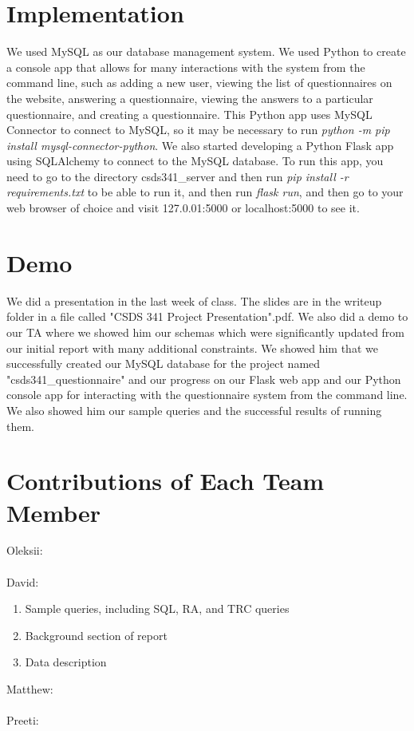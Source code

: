 \documentclass[12pt, oneside, a4paper]{article}
\begin{document}
    \section{Implementation}
    We used MySQL as our database management system. We used Python to create a console app that allows for many interactions with the system from the command line, such as adding a new user, viewing the list of questionnaires on the website, answering a questionnaire, viewing the answers to a particular questionnaire, and creating a questionnaire. This Python app uses MySQL Connector to connect to MySQL, so it may be necessary to run \emph{python -m pip install mysql-connector-python}. We also started developing a Python Flask app using SQLAlchemy to connect to the MySQL database. To run this app, you need to go to the directory csds341\_server and then run \emph{pip install -r requirements.txt} to be able to run it, and then run \emph{flask run}, and then go to your web browser of choice and visit 127.0.01:5000 or localhost:5000 to see it.
    \section{Demo}
    We did a presentation in the last week of class. The slides are in the writeup folder in a file called "CSDS 341 Project Presentation".pdf. We also did a demo to our TA where we showed him our schemas which were significantly updated from our initial report with many additional constraints. We showed him that we successfully created our MySQL database for the project named "csds341\_questionnaire" and our progress on our Flask web app and our Python console app for interacting with the questionnaire system from the command line. We also showed him our sample queries and the successful results of running them.
    \section{Contributions of Each Team Member}
    Oleksii:
    \\
    \\
    David:
    \begin{enumerate}
        \item Sample queries, including SQL, RA, and TRC queries
        \item Background section of report
        \item Data description
    \end{enumerate}
    Matthew:
    \\
    \\
    Preeti:
\end{document}
